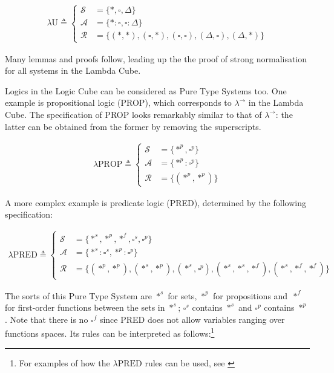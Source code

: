 \documentclass[12pt,toc=bibliography,numbers=noendperiod,
               footnotes=multiple,twoside]{scrartcl}
\begin{document}
\begin{align*}
\lambda\textrm{U} \triangleq
    \begin{cases}
        \mathcal{S} &= \{*,\square,\Delta\} \\
        \mathcal{A} &= \{*:\square,\square:\Delta\} \\
        \mathcal{R} &= \{(*,*),(\square,*),(\square,\square),(\Delta,\square),(\Delta,*)\}
    \end{cases}
\end{align*}

Many lemmas and proofs follow, leading up the the proof of strong normalisation for all systems in the Lambda Cube.

Logics in the Logic Cube can be considered as Pure Type Systems too. One example is propositional logic (PROP), which corresponds to \(\lambda^{\rightarrow}\) in the Lambda Cube. The specification of PROP looks remarkably similar to that of \(\lambda^{\rightarrow}\): the latter can be obtained from the former by removing the superscripts.

\begin{align*}
\lambda\textrm{PROP} \triangleq
    \begin{cases}
        \mathcal{S} &= \{*^p,\square^p\} \\
        \mathcal{A} &= \{*^p:\square^p\} \\
        \mathcal{R} &= \{(*^p,*^p)\}
    \end{cases}
\end{align*}

A more complex example is predicate logic (PRED), determined by the following specification:

\begin{align*}
\lambda\textrm{PRED} \triangleq
    \begin{cases}
        \mathcal{S} &= \{*^s,*^p,*^f,\square^s,\square^p\} \\
        \mathcal{A} &= \{*^s:\square^s,*^p:\square^p\} \\
        \mathcal{R} &= \{(*^p,*^p),(*^s,*^p),(*^s,\square^p),(*^s,*^s,*^f),(*^s,*^f,*^f)\}
    \end{cases}
\end{align*}

The sorts of this Pure Type System are \(*^s\) for sets, \(*^p\) for propositions and~\(*^f\) for first-order functions between the sets in \(*^s\); \(\square^s\) contains \(*^s\) and \(\square^p\) contains \(*^p\). Note that there is no \(\square^f\) since PRED does not allow variables ranging over functions spaces. Its rules can be interpreted as follows:\footnote{For examples of how the \(\lambda\textrm{PRED}\) rules can be used, see \textcite[255]{barendregt_lambda_1992}}
\end{document}
